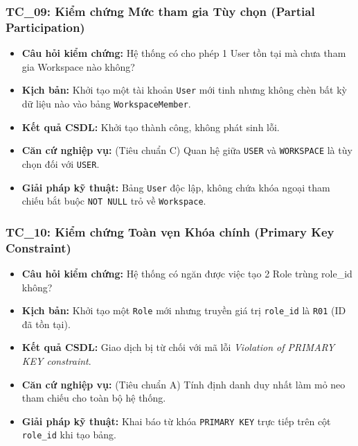 \subsubsection*{TC\_09: Kiểm chứng Mức tham gia Tùy chọn (Partial Participation)}
\begin{itemize}
    \item \textbf{Câu hỏi kiểm chứng:} Hệ thống có cho phép 1 User tồn tại mà chưa tham gia Workspace nào không?
    \item \textbf{Kịch bản:} Khởi tạo một tài khoản \texttt{User} mới tinh nhưng không chèn bất kỳ dữ liệu nào vào bảng \texttt{WorkspaceMember}.
    \item \textbf{Kết quả CSDL:} Khởi tạo thành công, không phát sinh lỗi.
    \item \textbf{Căn cứ nghiệp vụ:} (Tiêu chuẩn C) Quan hệ giữa \texttt{USER} và \texttt{WORKSPACE} là tùy chọn đối với \texttt{USER}.
    \item \textbf{Giải pháp kỹ thuật:} Bảng \texttt{User} độc lập, không chứa khóa ngoại tham chiếu bắt buộc \texttt{NOT NULL} trỏ về \texttt{Workspace}.
\end{itemize}

\subsubsection*{TC\_10: Kiểm chứng Toàn vẹn Khóa chính (Primary Key Constraint)}
\begin{itemize}
    \item \textbf{Câu hỏi kiểm chứng:} Hệ thống có ngăn được việc tạo 2 Role trùng role\_id không?
    \item \textbf{Kịch bản:} Khởi tạo một \texttt{Role} mới nhưng truyền giá trị \texttt{role\_id} là \texttt{R01} (ID đã tồn tại).
    \item \textbf{Kết quả CSDL:} Giao dịch bị từ chối với mã lỗi \textit{Violation of PRIMARY KEY constraint}.
    \item \textbf{Căn cứ nghiệp vụ:} (Tiêu chuẩn A) Tính định danh duy nhất làm mỏ neo tham chiếu cho toàn bộ hệ thống.
    \item \textbf{Giải pháp kỹ thuật:} Khai báo từ khóa \texttt{PRIMARY KEY} trực tiếp trên cột \texttt{role\_id} khi tạo bảng.
\end{itemize}

